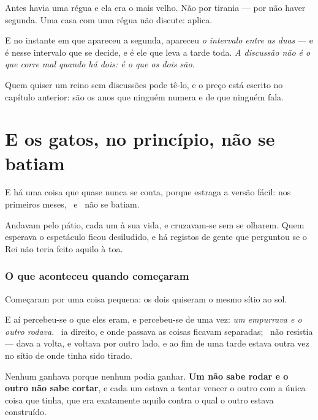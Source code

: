 \documentclass[livro.tex]{subfiles}
\begin{document}
Antes havia uma régua e ela era o mais velho. Não por tirania --- por não haver segunda. Uma casa
com uma régua não discute: aplica.

\medskip

E no instante em que apareceu a segunda, apareceu \emph{o intervalo entre as duas} --- e é nesse
intervalo que se decide, e é ele que leva a tarde toda. \emph{A discussão não é o que corre mal
quando há dois: é o que os dois são.}

\medskip

Quem quiser um reino sem discussões pode tê-lo, e o preço está escrito no capítulo anterior: são
os anos que ninguém numera e de que ninguém fala.

\chapter{E os gatos, no princípio, não se batiam}

E há uma coisa que quase nunca se conta, porque estraga a versão fácil: nos primeiros meses,
\Drk\ e \Ben\ não se batiam.

\medskip

Andavam pelo pátio, cada um à sua vida, e cruzavam-se sem se olharem. Quem esperava o espetáculo
ficou desiludido, e há registos de gente que perguntou se o Rei não teria feito aquilo à toa.

\subsection*{O que aconteceu quando começaram}

Começaram por uma coisa pequena: os dois quiseram o mesmo sítio ao sol.

\medskip

E aí percebeu-se o que eles eram, e percebeu-se de uma vez: \emph{um empurrava e o outro rodava}.
\Drk\ ia direito, e onde passava as coisas ficavam separadas; \Ben\ não resistia --- dava a volta,
e voltava por outro lado, e ao fim de uma tarde estava outra vez no sítio de onde tinha sido
tirado.

\medskip

Nenhum ganhava porque nenhum podia ganhar. \textbf{Um não sabe rodar e o outro não sabe cortar}, e
cada um estava a tentar vencer o outro com a única coisa que tinha, que era exatamente aquilo
contra o qual o outro estava construído.
\end{document}
